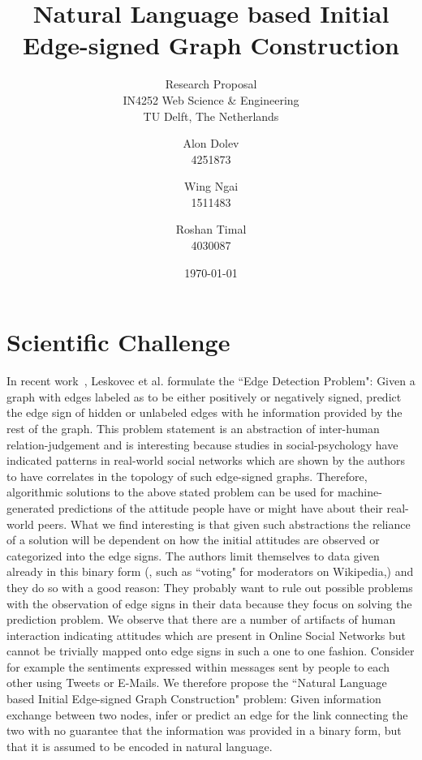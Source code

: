 \documentclass[a4paper,11pt]{scrartcl}
\title{ Natural Language based Initial Edge-signed Graph Construction}
\subtitle{Research Proposal \\ IN4252 Web Science \& Engineering \\ TU Delft, The Netherlands}
\author{
	Alon Dolev\\ 4251873  \and
	Wing Ngai \\ 1511483 \\   \and
	Roshan Timal \\ 4030087\\ 
}
\date{\today}
\begin{document}
 
\maketitle

\section{Scientific Challenge}

In recent work~\cite{Leskovec:2010}, Leskovec et al. formulate the ``Edge Detection Problem": Given a graph with edges labeled as to be either positively or negatively signed, predict the edge sign of hidden or unlabeled edges with he information provided by the rest of the graph. This problem statement is an abstraction of inter-human relation-judgement and is interesting because studies in social-psychology have indicated patterns in real-world social networks which are shown by the authors to have correlates in the topology of such edge-signed graphs. Therefore, algorithmic solutions to the above stated problem can be used for machine-generated predictions of the attitude people have or might have about their real-world peers. What we find interesting is that given such abstractions the reliance of a solution will be dependent on how the initial attitudes are observed or categorized into the edge signs. The authors limit themselves to data given already in this binary form (, such as ``voting" for moderators on Wikipedia,) and they do so with a good reason: They probably want to rule out possible problems with the observation of edge signs in their data because they focus on solving the prediction problem. We observe that there are a number of artifacts of human interaction indicating attitudes which are present in Online Social Networks but cannot be trivially mapped onto edge signs in such a one to one fashion. Consider for example the sentiments expressed within messages sent by people to each other using Tweets or E-Mails. We therefore propose the ``Natural Language based Initial Edge-signed Graph Construction" problem: Given information exchange between two nodes, infer or predict an edge for the link connecting the two with no guarantee that the information was provided in a binary form, but that it is assumed to be encoded in natural language.
\\
\\
\end{document}
